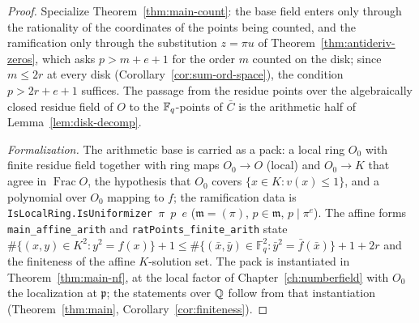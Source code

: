 \begin{proof}
\leanok
Specialize Theorem~\ref{thm:main-count}: the base field enters only
through the rationality of the coordinates of the points being counted, and the
ramification only through the substitution $z = \pi u$ of
Theorem~\ref{thm:antideriv-zeros}, which asks $p > m + e + 1$ for the order $m$ counted on
the disk; since $m \le 2r$ at every disk (Corollary~\ref{cor:sum-ord-space}), the condition
$p > 2r + e + 1$ suffices. The passage from the residue points over the algebraically closed
residue field of $O$ to the $\mathbb{F}_q$-points of $\bar C$ is the arithmetic half of
Lemma~\ref{lem:disk-decomp}.

\emph{Formalization.} The arithmetic base is carried as a pack: a local ring $O_0$ with
finite residue field together with ring maps $O_0 \to O$ (local) and $O_0 \to K$ that agree
in $\operatorname{Frac} O$, the hypothesis that $O_0$ covers $\{x \in K : v(x) \le 1\}$, and
a polynomial over $O_0$ mapping to $f$; the ramification data is
\texttt{IsLocalRing.IsUniformizer $\pi$ $p$ $e$} ($\mathfrak m = (\pi)$, $p \in \mathfrak m$,
$p \mid \pi^e$). The affine forms \texttt{main\_affine\_arith} and
\texttt{ratPoints\_finite\_arith} state
$\#\{(x,y) \in K^2 : y^2 = f(x)\} + 1 \le \#\{(\bar x,\bar y) \in \mathbb F_q^2 :
\bar y^2 = \bar f(\bar x)\} + 1 + 2r$ and the finiteness of the affine $K$-solution set.
The pack is instantiated in Theorem~\ref{thm:main-nf}, at the local factor of
Chapter~\ref{ch:numberfield} with $O_0$ the localization at $\mathfrak p$; the statements
over $\mathbb{Q}$ follow from that instantiation (Theorem~\ref{thm:main},
Corollary~\ref{cor:finiteness}).
\end{proof}

